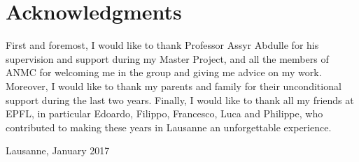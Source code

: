 \section*{Acknowledgments}

First and foremost, I would like to thank Professor Assyr Abdulle for his supervision and support during my Master Project, and all the members of ANMC for welcoming me in the group and giving me advice on my work. Moreover, I would like to thank my parents and family for their unconditional support during the last two years. Finally, I would like to thank all my friends at EPFL, in particular Edoardo, Filippo, Francesco, Luca and Philippe, who contributed to making these years in Lausanne an unforgettable experience. \\[1cm]

\begin{flushright}
Lausanne, January 2017
\end{flushright}
